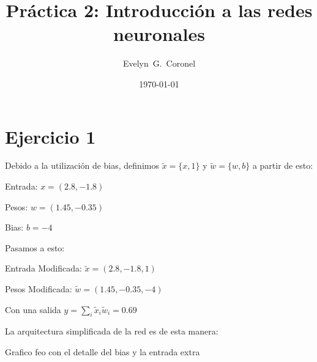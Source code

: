 


\title{Práctica 2: Introducción a las redes neuronales}
\author{Evelyn~G.~Coronel}


\date[]{\lowercase{\today}} %

\maketitle


\section*{Ejercicio 1}

Debido a la utilización  de bias, definimos $\tilde x = \{ x, 1\}$ y $\tilde w =\{ w, b \}$ a partir de esto:

Entrada: $ x = (2.8, -1.8)$

Pesos: $ w = (1.45, -0.35)$

Bias: $b= -4$

Pasamos a esto:

Entrada Modificada: $ \tilde x = (2.8, -1.8, 1)$

Pesos Modificada: $\tilde  w = (1.45, -0.35, -4)$

Con una salida $y = \sum_i \tilde x_i \tilde{w}_i = 0.69$

La arquitectura simplificada de la red es de esta manera:


Grafico feo con el detalle del bias y la entrada extra



